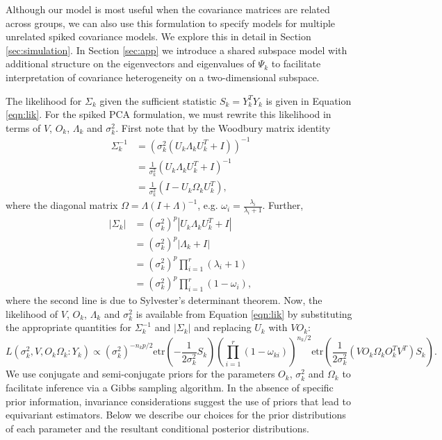 \documentclass{statsoc}
\newcommand{\etr}{\text{etr}}
\begin{document}
Although our model
is most useful when the covariance matrices are related across groups,
we can also use this formulation to specify models for multiple
unrelated spiked covariance models.  We explore this in detail in
Section \ref{sec:simulation}.  In Section \ref{sec:app} we introduce a
shared subspace model with additional structure on the eigenvectors
and eigenvalues of $\Psi_k$ to facilitate interpretation of covariance
heterogeneity on a two-dimensional subspace.


The likelihood for $\Sigma_k$ given the sufficient statistic
$S_k = Y_k^TY_k$ is given in Equation \ref{eqn:lik}.  For the
spiked PCA formulation, we must rewrite this likelihood in terms of $V$, $O_k$,
$\Lambda_k$ and $\sigma_k^2$.  First note that by the Woodbury matrix
identity
\begin{align}
\nonumber \Sigma^{-1}_k &=  (\sigma_k^2(U_k\Lambda_kU_k^T+I))^{-1}\\
\nonumber &= \frac{1}{\sigma_k^2}(U_k\Lambda_kU_k^T+I)^{-1}\\
&= \frac{1}{\sigma_k^2}(I-U_k\Omega_kU_k^T),
\end{align}
%
\noindent where the diagonal matrix $\Omega = \Lambda(I+\Lambda)^{-1}$, e.g. $\omega_i = \frac{\lambda_i}{\lambda_{i}+1}$.  Further, 
%
\begin{align}
\nonumber |\Sigma_k| &= (\sigma_k^2)^{p}|U_k\Lambda_kU_k^T+I|\\
\nonumber &= (\sigma_k^2)^{p}|\Lambda_k+I| \\
\nonumber &= (\sigma_k^2)^{p}\prod_{i=1}^r(\lambda_i+1)\\
&= (\sigma_k^2)^{p}\prod_{i=1}^r(1-\omega_i),
\end{align}
%
\noindent where the second line is due to Sylvester's determinant
theorem.  Now, the likelihood of $V$, $O_k$, $\Lambda_k$ and
$\sigma_k^2$ is available from Equation \ref{eqn:lik} by substituting
the appropriate quantities for $\Sigma^{-1}_k$ and $|\Sigma_k|$ and
replacing $U_k$ with $VO_k$:
%
\begin{equation}
 L(\sigma_k^2, V , O_k \Omega_k : Y_k) \propto
    (\sigma_k^2)^{-n_kp/2}\etr(-\frac{1}{2\sigma_k^2}S_k)\left(\prod_{i=1}^r(1-\omega_{ki})
   \right) ^{n_k/2}
   \etr(\frac{1}{2\sigma_k^2}(VO_k\Omega_kO_k^TV^T)S_k).
\label{eqn:sslik}
\end{equation}
%
\noindent We use conjugate and semi-conjugate priors for the parameters $O_k$,
$\sigma^2_k$ and $\Omega_k$ to facilitate inference via a Gibbs
sampling algorithm.  In the absence of specific prior information,
invariance considerations suggest the use of priors that lead to
equivariant estimators.  Below we describe our choices for the prior
distributions of each parameter and the resultant conditional posterior
distributions.
\end{document}
